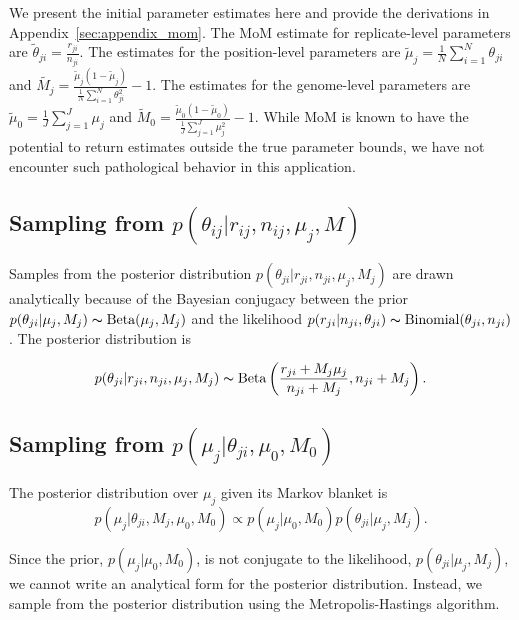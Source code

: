 \documentclass[11pt,reqno]{amsart}
\begin{document}
We present the initial parameter estimates here and provide the derivations in Appendix~\ref{sec:appendix_mom}. The MoM estimate for replicate-level parameters are $\tilde{\theta}_{ji} = \frac{r_{ji}} {n_{ji}}$. The estimates for the position-level parameters are $\tilde{\mu}_j = \frac{1}{N} \sum_{i=1}^N \theta_{ji}$ and $\tilde{M_j} = \frac{ \tilde{\mu}_j (1 - \tilde{\mu}_j ) } { \frac{1}{N} \sum_{i=1}^N \theta_{ji}^2 } -1$. The estimates for the genome-level parameters are $\tilde{\mu}_0 = \frac{1}{J} \sum_{j=1}^J \mu_j$ and $\tilde{M}_0 = \frac{ \tilde{\mu}_0 (1 - \tilde{\mu}_0 ) } {\frac{1}{J} \sum_{j=1}^J \mu_j^2 } -1$. While MoM is known to have the potential to return estimates outside the true parameter bounds, we have not encounter such pathological behavior in this application. 

\subsection{Sampling from $p \left( \theta_{ij} |r_{ij},n_{ij},\mu_j,M \right)$}

Samples from the posterior distribution $p(\theta_{ji} | r_{ji}, n_{ji}, \mu_j, M_j)$ are drawn analytically because of the Bayesian conjugacy between the prior $p(\theta_{ji} | \mu_j, M_j) \thicksim \text{Beta}(\mu_j, M_j)$ and the likelihood $p(r_{ji} | n_{ji}, \theta_{ji}) \thicksim \text{Binomial}(\theta_{ji}, n_{ji})$. The posterior distribution is 

\begin{equation}
	p(\theta_{ji} | r_{ji}, n_{ji}, \mu_j, M_j) \thicksim \text{Beta}\left( \frac{r_{ji} + M_j \mu_j}{n_{ji} + M_j} , n_{ji} + M_j\right).
\end{equation}

\subsection{Sampling from $p \left( \mu_j |\theta_{ji},\mu_0,M_0\right)$}
The posterior distribution over $\mu_j$ given its Markov blanket is 
\begin{equation}
	p( \mu_j | \theta_{ji}, M_j, \mu_0, M_0 ) \propto p(\mu_j | \mu_0, M_0) p(\theta_{ji} | \mu_j, M_j).
\end{equation}

Since the prior, $p(\mu_j | \mu_0, M_0)$, is not conjugate to the likelihood, $p(\theta_{ji} | \mu_j, M_j)$, we cannot write an analytical form for the posterior distribution. Instead, we sample from the posterior distribution using the Metropolis-Hastings algorithm.
\end{document}
